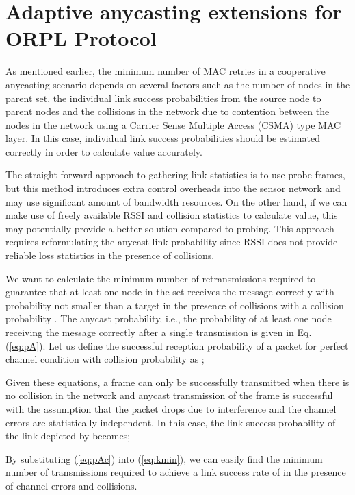 \documentclass[conference]{IEEEtran}
\begin{document}
\section{Adaptive anycasting extensions for ORPL Protocol}

As mentioned earlier, the minimum number of MAC retries in a cooperative anycasting scenario depends on several factors such as the number of nodes in the parent set, the individual link success probabilities from the source node to parent nodes and the collisions in the network due to contention between the nodes in the network using a Carrier Sense Multiple Access (CSMA) type MAC layer. In this case, individual link success probabilities should be estimated correctly in order to calculate  value accurately. 

The straight forward approach to gathering link statistics is to use probe frames, but this method introduces extra control overheads into the sensor network and may use significant amount of bandwidth resources. On the other hand, if we can make use of freely available RSSI and collision statistics to calculate  value, this may potentially provide a better solution compared to probing. This approach requires reformulating the anycast link probability since RSSI does not provide reliable loss statistics in the presence of collisions. 

We want to calculate the minimum number of retransmissions
required to guarantee that at least one node in the set receives the
message correctly with probability not smaller than a target  in the presence of collisions with a collision probability . The anycast probability, i.e., the probability of
at least one node receiving the message correctly after a single
transmission is given in Eq. (\ref{eq:pA}). Let us define the successful reception probability of a packet for perfect channel condition with collision probability  as ;


Given these equations, a frame can only be successfully transmitted when there is no collision in the network and anycast transmission of the frame is successful with the assumption that the packet drops due to interference and the channel errors are statistically independent. In this case, the link success probability of the link depicted by  becomes;


 
By substituting (\ref{eq:pAc}) into (\ref{eq:kmin}), we can easily find the minimum number of transmissions required to achieve a link success rate of  in the presence of channel errors and collisions.
\end{document}
